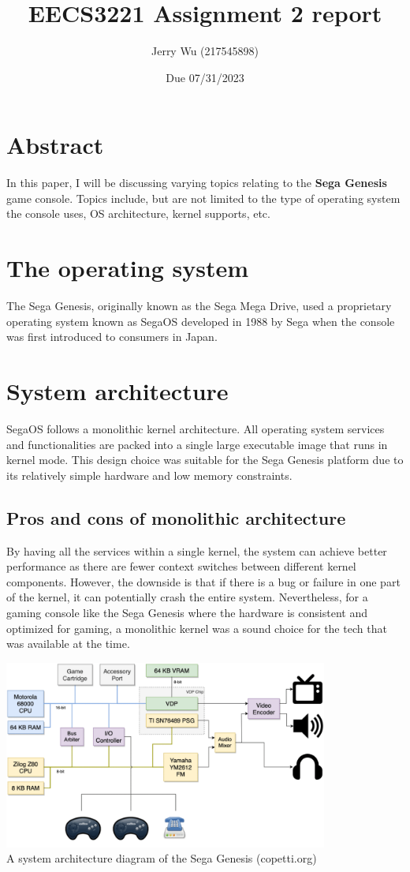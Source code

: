 \documentclass[12pt]{article}
\title{EECS3221 Assignment 2 report}
\author{Jerry Wu (217545898)}
\date{Due 07/31/2023}
\begin{document}
\maketitle

\section*{Abstract}
In this paper, I will be discussing varying topics relating to the \textbf{Sega Genesis} game console. Topics include, but are not limited to the type of operating system the console uses, OS architecture, kernel supports, etc.

\section{The operating system}

The Sega Genesis, originally known as the Sega Mega Drive, used a proprietary operating system known as SegaOS developed in 1988 by Sega when the console was first introduced to consumers in Japan.

\section{System architecture}
SegaOS follows a monolithic kernel architecture. All operating system services and functionalities are packed into a single large executable image that runs in kernel mode. This design choice was suitable for the Sega Genesis platform due to its relatively simple hardware and low memory constraints.

\subsection*{Pros and cons of monolithic architecture}
By having all the services within a single kernel, the system can achieve better performance as there are fewer context switches between different kernel components. However, the downside is that if there is a bug or failure in one part of the kernel, it can potentially crash the entire system. Nevertheless, for a gaming console like the Sega Genesis where the hardware is consistent and optimized for gaming, a monolithic kernel was a sound choice for the tech that was available at the time.


\includegraphics[width=0.8\textwidth]{diagram}
\\A system architecture diagram of the Sega Genesis (copetti.org)
\end{document}
